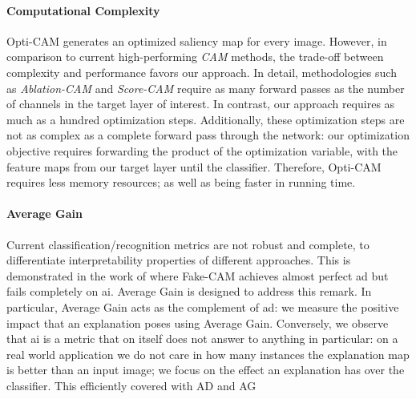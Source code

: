 \paragraph{Computational Complexity} Opti-CAM generates an optimized saliency map for every image. 
However, in comparison to current high-performing \emph{CAM} methods, the trade-off between 
complexity and performance favors our approach. In detail, methodologies such as \emph{Ablation-CAM} and 
\emph{Score-CAM} require as many forward passes as the number of channels in the target layer of 
interest. In contrast, our approach requires as much as a hundred optimization steps. 
Additionally, these optimization steps are not as complex as a complete forward pass through the 
network: our optimization objective requires forwarding the product of the optimization variable,
with the feature maps from our target layer until the classifier. Therefore, Opti-CAM requires
less memory resources; as well as being faster in running time.\\

\paragraph{Average Gain} Current classification/recognition metrics are not robust and complete,
to differentiate interpretability properties of different approaches. This is 
demonstrated in the work of \autocite{poppi2021revisiting} where Fake-CAM achieves almost perfect 
\gls{ad} but fails completely on \gls{ai}. Average Gain is designed to address this remark. In 
particular, Average Gain acts as the complement of \gls{ad}: we measure the positive impact that 
an explanation poses using Average Gain. Conversely, we observe that \gls{ai} is a metric that on 
itself does not answer to anything in particular: on a real world application we do not care in 
how many instances the explanation map is better than an input image; we focus on the 
effect an explanation has over the classifier. This efficiently covered with AD and AG\\